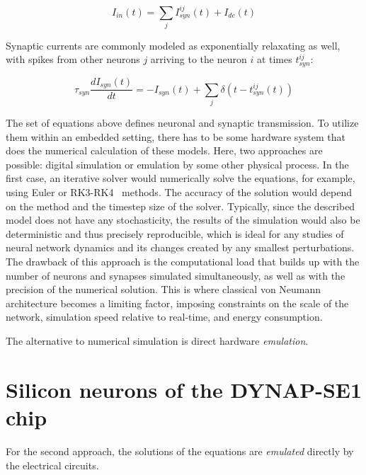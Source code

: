 \begin{equation}
    I_{in}(t) = \sum_{j}I^{ij}_{syn}(t) + I_{dc}(t)
    \label{eq:I_in}
\end{equation}

Synaptic currents are commonly modeled as exponentially relaxating as well, with spikes from other neurons $j$ arriving to the neuron $i$ at times $t^{ij}_{syn}$:

\begin{equation}
    \tau_{syn}\frac{dI_{syn}(t)}{dt} = -I_{syn}(t) + \sum_{j}\delta(t - t^{ij}_{syn}(t))
    \label{eq:I_syn}
\end{equation}

The set of equations above defines neuronal and synaptic transmission. To utilize them within an embedded setting, there has to be some hardware system that does the numerical calculation of these models.
Here, two approaches are possible: digital simulation or emulation by some other physical process.
In the first case, an iterative solver would numerically solve the equations, for example, using Euler or RK3-RK4~\cite{Butcher96, Brette_etal07} methods. The accuracy of the solution would depend on the method and the timestep size of the solver. Typically, since the described model does not have any stochasticity, the results of the simulation would also be deterministic and thus precisely reproducible, which is ideal for any studies of neural network dynamics and its changes created by any smallest perturbations. The drawback of this approach is the computational load that builds up with the number of neurons and synapses simulated simultaneously, as well as with the precision of the numerical solution. This is where classical von Neumann architecture becomes a limiting factor, imposing constraints on the scale of the network, simulation speed relative to real-time, and energy consumption.

The alternative to numerical simulation is direct hardware \emph{emulation}.

\section{Silicon neurons of the DYNAP-SE1 chip}



For the second approach, the solutions of the equations are \emph{emulated} directly by the electrical circuits. %

